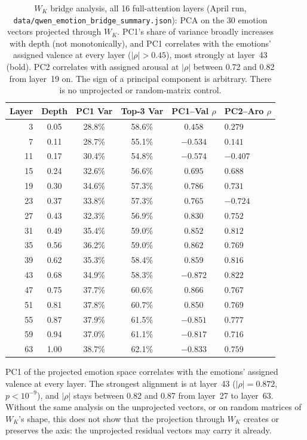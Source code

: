 \documentclass[11pt,a4paper]{article}
\begin{document}
\begin{table}[H]
\centering
\caption{$W_K$ bridge analysis, all 16 full-attention layers (April run, \texttt{data/qwen\_emotion\_bridge\_summary.json}): PCA on the 30 emotion vectors projected through $W_K$. PC1's share of variance broadly increases with depth (not monotonically), and PC1 correlates with the emotions' assigned valence at every layer ($|\rho| > 0.45$), most strongly at layer~43 (bold). PC2 correlates with assigned arousal at $|\rho|$ between 0.72 and 0.82 from layer~19 on. The sign of a principal component is arbitrary. There is no unprojected or random-matrix control.}
\label{tab:bridge}
\begin{tabular}{rccccl}
\toprule
\textbf{Layer} & \textbf{Depth} & \textbf{PC1 Var} & \textbf{Top-3 Var} & \textbf{PC1--Val $\rho$} & \textbf{PC2--Aro $\rho$} \\
\midrule
 3 & 0.05 & 28.8\% & 58.6\% & $0.458$ & $0.279$ \\
 7 & 0.11 & 28.7\% & 55.1\% & $-0.534$ & $0.141$ \\
11 & 0.17 & 30.4\% & 54.8\% & $-0.574$ & $-0.407$ \\
15 & 0.24 & 32.6\% & 56.6\% & $0.695$ & $0.688$ \\
19 & 0.30 & 34.6\% & 57.3\% & $0.786$ & $0.731$ \\
23 & 0.37 & 33.8\% & 57.3\% & $0.765$ & $-0.724$ \\
27 & 0.43 & 32.3\% & 56.9\% & $0.830$ & $0.752$ \\
31 & 0.49 & 35.4\% & 59.0\% & $0.852$ & $0.812$ \\
35 & 0.56 & 36.2\% & 59.0\% & $0.862$ & $0.769$ \\
39 & 0.62 & 35.3\% & 58.4\% & $0.859$ & $0.816$ \\
43 & 0.68 & 34.9\% & 58.3\% & $\mathbf{-0.872}$ & $0.822$ \\
47 & 0.75 & 37.7\% & 60.6\% & $0.866$ & $0.767$ \\
51 & 0.81 & 37.8\% & 60.7\% & $0.850$ & $0.769$ \\
55 & 0.87 & 37.9\% & 61.5\% & $-0.851$ & $0.777$ \\
59 & 0.94 & 37.0\% & 61.1\% & $-0.817$ & $0.716$ \\
63 & 1.00 & 38.7\% & 62.1\% & $-0.833$ & $0.759$ \\
\bottomrule
\end{tabular}
\end{table}

PC1 of the projected emotion space correlates with the emotions' assigned valence at every layer. The strongest alignment is at layer~43 ($|\rho| = 0.872$, $p < 10^{-9}$), and $|\rho|$ stays between 0.82 and 0.87 from layer~27 to layer~63. Without the same analysis on the unprojected vectors, or on random matrices of $W_K$'s shape, this does not show that the projection through $W_K$ creates or preserves the axis: the unprojected residual vectors may carry it already.
\end{document}
